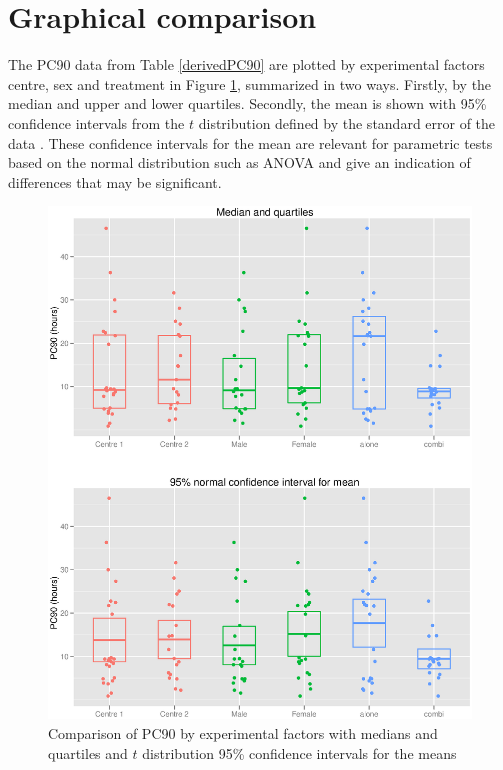 \section{Graphical comparison}
The PC90 data from Table \ref{derivedPC90} are plotted by experimental factors centre, sex and treatment in Figure \ref{pc90boxes}, summarized in two ways. Firstly, by the median and upper and lower quartiles. Secondly, the mean is shown with 95\% confidence intervals from the $t$ distribution defined by the standard error of the data%
. These confidence intervals for the mean are relevant for parametric tests based on the normal distribution such as ANOVA and give an indication of differences that may be significant.
\begin{figure}[p]
\includegraphics[width=150mm]{pc90boxes.eps} 
\caption{Comparison of PC90 by experimental factors with medians and quartiles and $t$ distribution 95\% confidence intervals for the means}
\label{pc90boxes}
\end{figure}

